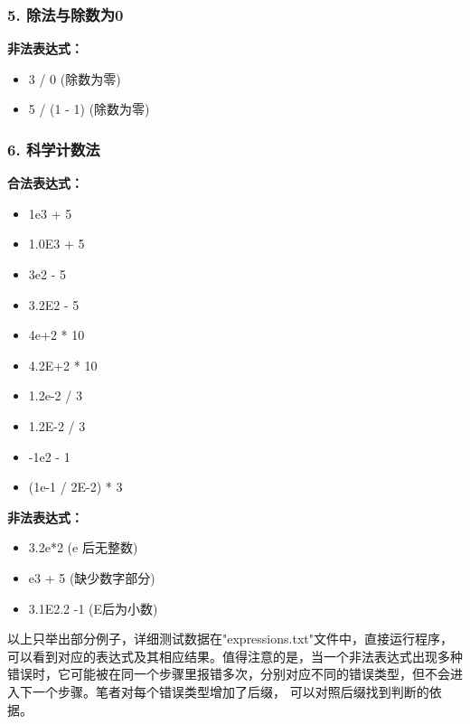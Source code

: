 \documentclass[fontset=fandol]{ctexart}
\begin{document}
\subsubsection*{5. 除法与除数为0}

\textbf{非法表达式：}
\begin{itemize}
  \item  3 / 0  \quad (除数为零)
  \item  5 / (1 - 1) \quad (除数为零)
\end{itemize}

\subsubsection*{6. 科学计数法}

\textbf{合法表达式：}
\begin{itemize}
  \item  1e3 + 5 
  \item  1.0E3 + 5
  \item  3e2 - 5 
  \item  3.2E2 - 5
  \item  4e+2 * 10
  \item  4.2E+2 * 10
  \item  1.2e-2 / 3
  \item  1.2E-2 / 3 
  \item  -1e2 - 1
  \item  (1e-1 / 2E-2) * 3 
\end{itemize}

\textbf{非法表达式：}
\begin{itemize}
  \item  3.2e*2  \quad (e 后无整数)
  \item  e3 + 5  \quad (缺少数字部分)
  \item  3.1E2.2 -1 \quad (E后为小数)
\end{itemize}
以上只举出部分例子，详细测试数据在"expressions.txt"文件中，直接运行程序，可以看到对应的表达式及其相应结果。值得注意的是，当一个非法表达式出现多种错误时，它可能被在同一个步骤里报错多次，分别对应不同的错误类型，但不会进入下一个步骤。笔者对每个错误类型增加了后缀，
可以对照后缀找到判断的依据。
\end{document}
